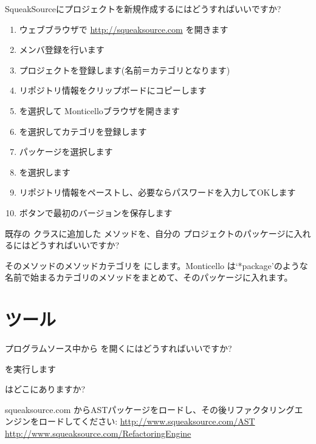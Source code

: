 \documentclass[a4paper,10pt,twoside]{book}
\begin{document}
\begin{faq}
SqueakSourceにプロジェクトを新規作成するにはどうすればいいですか?
\end{faq}
\answer
\begin{enumerate}
  \item ウェブブラウザで \url{http://squeaksource.com} を開きます
  \item メンバ登録を行います
  \item プロジェクトを登録します(名前＝カテゴリとなります)
  \item リポジトリ情報をクリップボードにコピーします
  \item {} を選択して Monticelloブラウザを開きます
  \item {} を選択してカテゴリを登録します
  \item パッケージを選択します
  \item {} を選択します
  \item リポジトリ情報をペーストし、必要ならパスワードを入力してOKします
  \item {}ボタンで最初のバージョンを保存します
\end{enumerate}

\begin{faq}
既存の  クラスに追加した  メソッドを、自分の  プロジェクトのパッケージに入れるにはどうすればいいですか?
\end{faq}
\answer
そのメソッドのメソッドカテゴリを  にします。Monticello は‘*package’のような名前で始まるカテゴリのメソッドをまとめて、そのパッケージに入れます。

\section{ツール}

\begin{faq}
プログラムソース中から   を開くにはどうすればいいですか?
\end{faq}
\answer
  を実行します

\begin{faq}
 はどこにありますか? 
\end{faq}
\answer
squeaksource.com からASTパッケージをロードし、その後リファクタリングエンジンをロードしてください:
\url{http://www.squeaksource.com/AST}
\url{http://www.squeaksource.com/RefactoringEngine}
\end{document}
